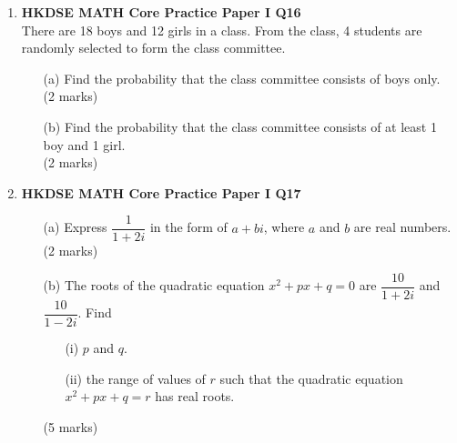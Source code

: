 \documentclass[12pt]{article}
\begin{document}
\begin{enumerate}
	\item \textbf{HKDSE MATH Core Practice Paper I Q16}\\
	There are 18 boys and 12 girls in a class. From the class, 4 students are randomly selected to form
	the class committee.
	\begin{enumerate}
		\item[(a)] Find the probability that the class committee consists of boys only. \\(2 marks)
		\item[(b)] Find the probability that the class committee consists of at least 1 boy and 1 girl. \\(2 marks)
	\end{enumerate}

	\item \textbf{HKDSE MATH Core Practice Paper I Q17}
	\begin{enumerate}
		\item[(a)] 	Express $\dfrac{1}{1 + 2i}$ in the form of $a + bi$, where $a$ and $b$ are real numbers. \\(2 marks)
		\item[(b)] The roots of the quadratic equation $x^2 + px + q = 0$ are $\dfrac{10}{1 + 2i}$ and $\dfrac{10}{1 - 2i}$. Find
		\begin{enumerate}
			\item[(i)] $p$ and $q$.
			\item[(ii)] the range of values of $r$ such that the quadratic equation $x^2 + px + q = r$ has real roots.
		\end{enumerate}
		(5 marks)
	\end{enumerate}


\end{enumerate}
\end{document}
